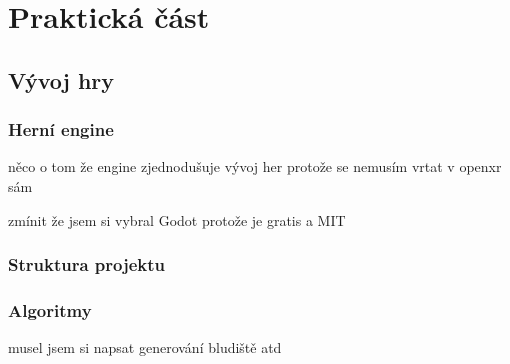 \part{Praktická část}

\chapter{Vývoj hry}

\section{Herní engine}
něco o tom že engine zjednodušuje vývoj her protože se nemusím vrtat v openxr sám

zmínit že jsem si vybral Godot protože je gratis a MIT

\section{Struktura projektu}

\section{Algoritmy}
musel jsem si napsat generování bludiště atd

